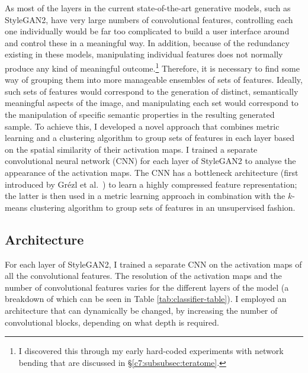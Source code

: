 As most of the layers in the current state-of-the-art generative models, such as StyleGAN2, have very large numbers of convolutional features, controlling each one individually would be far too complicated to build a user interface around and control these in a meaningful way. 
In addition, because of the redundancy existing in these models, manipulating individual features does not normally produce any kind of meaningful outcome.\footnote{I discovered this through my early hard-coded experiments with network bending that are discussed in \S \ref{c7:subsubsec:teratome}.} 
Therefore, it is necessary to find some way of grouping them into more manageable ensembles of sets of features. 
Ideally, such sets of features would correspond to the generation of distinct, semantically meaningful aspects of the image, and manipulating each set would correspond to the manipulation of specific semantic properties in the resulting generated sample. 
To achieve this, I developed a novel approach that combines metric learning and a clustering algorithm to group sets of features in each layer based on the spatial similarity of their activation maps. 
I trained a separate convolutional neural network (CNN) for each layer of StyleGAN2 to analyse the appearance of the activation maps. 
The CNN has a bottleneck architecture (first introduced by Gr{\'e}zl et al.~\citep{grezl2007probabilistic}) to learn a highly compressed feature representation; the latter is then used in a metric learning approach in combination with the $k$-means clustering algorithm \citep{lloyd1982least, celebi2013comparative} to group sets of features in an unsupervised fashion. 

\subsection{Architecture}

For each layer of StyleGAN2, I trained a separate CNN on the activation maps of all the convolutional features. 
The resolution of the activation maps and the number of convolutional features varies for the different layers of the model (a breakdown of which can be seen in Table \ref{tab:classifier-table}).
I employed an architecture that can dynamically be changed, by increasing the number of convolutional blocks, depending on what depth is required. 

